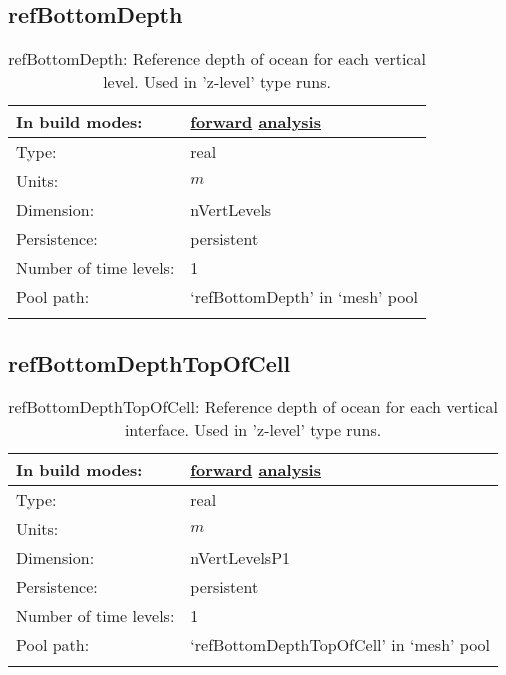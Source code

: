 \subsection[refBottomDepth]{refBottomDepth}
\label{subsec:var_sec_mesh_refBottomDepth}
\begin{center}
\begin{longtable}{| p{2.0in} | p{4.0in} |}
        \hline 
        In build modes: & \hyperref[subsec:forward_var_tab_mesh]{forward} \hyperref[subsec:analysis_var_tab_mesh]{analysis} \\
        \hline 
        Type: & real \\
        \hline 
        Units: & $m$ \\
        \hline 
        Dimension: & nVertLevels \\
        \hline 
        Persistence: & persistent \\
        \hline 
        Number of time levels: & 1 \\
        \hline 
            Pool path: & `refBottomDepth' in `mesh' pool \\
		 \hline 
    \caption{refBottomDepth: Reference depth of ocean for each vertical level. Used in 'z-level' type runs.}
\end{longtable}
\end{center}
\subsection[refBottomDepthTopOfCell]{refBottomDepthTopOfCell}
\label{subsec:var_sec_mesh_refBottomDepthTopOfCell}
\begin{center}
\begin{longtable}{| p{2.0in} | p{4.0in} |}
        \hline 
        In build modes: & \hyperref[subsec:forward_var_tab_mesh]{forward} \hyperref[subsec:analysis_var_tab_mesh]{analysis} \\
        \hline 
        Type: & real \\
        \hline 
        Units: & $m$ \\
        \hline 
        Dimension: & nVertLevelsP1 \\
        \hline 
        Persistence: & persistent \\
        \hline 
        Number of time levels: & 1 \\
        \hline 
            Pool path: & `refBottomDepthTopOfCell' in `mesh' pool \\
		 \hline 
    \caption{refBottomDepthTopOfCell: Reference depth of ocean for each vertical interface. Used in 'z-level' type runs.}
\end{longtable}
\end{center}
